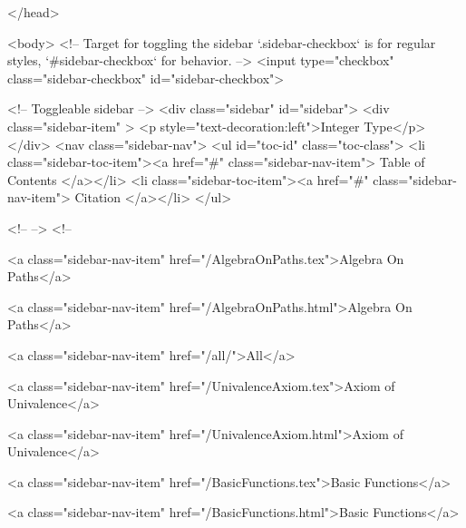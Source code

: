   
</head>




  <body>
    <!-- Target for toggling the sidebar `.sidebar-checkbox` is for regular
     styles, `#sidebar-checkbox` for behavior. -->
<input type="checkbox" class="sidebar-checkbox" id="sidebar-checkbox">

<!-- Toggleable sidebar -->
<div class="sidebar" id="sidebar">
  <div class="sidebar-item" >
    <p style="text-decoration:left">Integer Type</p>
  </div>
  <nav class="sidebar-nav">
    <ul id="toc-id" class="toc-class">
  <li class="sidebar-toc-item"><a href="#" class="sidebar-nav-item"> Table of Contents </a></li>
  <li class="sidebar-toc-item"><a href="#" class="sidebar-nav-item"> Citation </a></li>
</ul>


    <!--  -->
    <!-- 
      
    
      
    
      
    
      
        
      
    
      
        
          <a class="sidebar-nav-item" href="/AlgebraOnPaths.tex">Algebra On Paths</a>
        
      
    
      
        
          <a class="sidebar-nav-item" href="/AlgebraOnPaths.html">Algebra On Paths</a>
        
      
    
      
        
          <a class="sidebar-nav-item" href="/all/">All</a>
        
      
    
      
        
          <a class="sidebar-nav-item" href="/UnivalenceAxiom.tex">Axiom of Univalence</a>
        
      
    
      
        
          <a class="sidebar-nav-item" href="/UnivalenceAxiom.html">Axiom of Univalence</a>
        
      
    
      
        
          <a class="sidebar-nav-item" href="/BasicFunctions.tex">Basic Functions</a>
        
      
    
      
        
          <a class="sidebar-nav-item" href="/BasicFunctions.html">Basic Functions</a>
        
